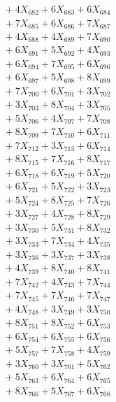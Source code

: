 \documentclass[a4paper,10pt]{article}
\begin{document}
{\begin{align}
&\;  + 4 X_{682} + 6 X_{683} + 6 X_{684} \\[0.3ex]
&\;  + 7 X_{685} + 6 X_{686} + 7 X_{687} \\[0.3ex]
&\;  + 4 X_{688} + 4 X_{689} + 7 X_{690} \\[0.3ex]
&\;  + 6 X_{691} + 5 X_{692} + 4 X_{693} \\[0.3ex]
&\;  + 6 X_{694} + 7 X_{695} + 6 X_{696} \\[0.3ex]
&\;  + 6 X_{697} + 5 X_{698} + 8 X_{699} \\[0.5ex]\allowbreak
&\;  + 7 X_{700} + 6 X_{701} + 3 X_{702} \\[0.3ex]
&\;  + 3 X_{703} + 8 X_{704} + 3 X_{705} \\[0.3ex]
&\;  + 5 X_{706} + 4 X_{707} + 7 X_{708} \\[0.3ex]
&\;  + 8 X_{709} + 7 X_{710} + 6 X_{711} \\[0.3ex]
&\;  + 7 X_{712} + 3 X_{713} + 6 X_{714} \\[0.3ex]
&\;  + 8 X_{715} + 7 X_{716} + 8 X_{717} \\[0.3ex]
&\;  + 6 X_{718} + 6 X_{719} + 5 X_{720} \\[0.3ex]
&\;  + 6 X_{721} + 5 X_{722} + 3 X_{723} \\[0.3ex]
&\;  + 5 X_{724} + 8 X_{725} + 7 X_{726} \\[0.3ex]
&\;  + 3 X_{727} + 4 X_{728} + 8 X_{729} \\[0.5ex]\allowbreak
&\;  + 3 X_{730} + 5 X_{731} + 8 X_{732} \\[0.3ex]
&\;  + 3 X_{733} + 7 X_{734} + 4 X_{735} \\[0.3ex]
&\;  + 3 X_{736} + 3 X_{737} + 3 X_{738} \\[0.3ex]
&\;  + 4 X_{739} + 8 X_{740} + 8 X_{741} \\[0.3ex]
&\;  + 7 X_{742} + 4 X_{743} + 7 X_{744} \\[0.3ex]
&\;  + 7 X_{745} + 7 X_{746} + 7 X_{747} \\[0.3ex]
&\;  + 4 X_{748} + 3 X_{749} + 3 X_{750} \\[0.3ex]
&\;  + 8 X_{751} + 8 X_{752} + 6 X_{753} \\[0.3ex]
&\;  + 6 X_{754} + 6 X_{755} + 6 X_{756} \\[0.3ex]
&\;  + 5 X_{757} + 7 X_{758} + 4 X_{759} \\[0.5ex]\allowbreak
&\;  + 3 X_{760} + 3 X_{761} + 5 X_{762} \\[0.3ex]
&\;  + 5 X_{763} + 6 X_{764} + 6 X_{765} \\[0.3ex]
&\;  + 8 X_{766} + 5 X_{767} + 6 X_{768} \\[0.3ex]

\end{align}}
\end{document}
